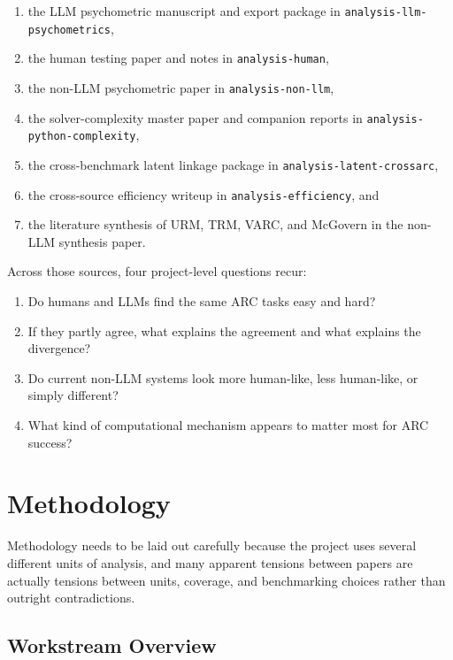 \documentclass[11pt,letterpaper]{article}
\begin{document}
\begin{enumerate}
    \item the LLM psychometric manuscript and export package in \texttt{analysis-llm-psychometrics},
    \item the human testing paper and notes in \texttt{analysis-human},
    \item the non-LLM psychometric paper in \texttt{analysis-non-llm},
    \item the solver-complexity master paper and companion reports in \texttt{analysis-python-complexity},
    \item the cross-benchmark latent linkage package in \texttt{analysis-latent-crossarc},
    \item the cross-source efficiency writeup in \texttt{analysis-efficiency}, and
    \item the literature synthesis of URM, TRM, VARC, and McGovern in the non-LLM synthesis paper.
\end{enumerate}

Across those sources, four project-level questions recur:

\begin{enumerate}
    \item Do humans and LLMs find the same ARC tasks easy and hard?
    \item If they partly agree, what explains the agreement and what explains the divergence?
    \item Do current non-LLM systems look more human-like, less human-like, or simply different?
    \item What kind of computational mechanism appears to matter most for ARC success?
\end{enumerate}

\section{Methodology}

Methodology needs to be laid out carefully because the project uses several different units of analysis, and many apparent tensions between papers are actually tensions between units, coverage, and benchmarking choices rather than outright contradictions.

\subsection{Workstream Overview}
\end{document}
